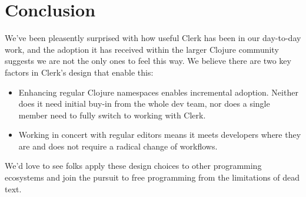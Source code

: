 \documentclass[sigconf,screen]{acmart}
\providecommand{\tightlist}{%
  \setlength{\itemsep}{0pt}\setlength{\parskip}{0pt}}
\begin{document}
\hypertarget{id}{%
\section{Conclusion}\label{id}}

We've been pleasently surprised with how useful Clerk has been in our day-to-day work, and the adoption it has received within the larger Clojure community suggests we are not the only ones to feel this way. We believe there are two key factors in Clerk's design that enable this:

\begin{itemize}
\tightlist
\item
  Enhancing regular Clojure namespaces enables incremental adoption. Neither does it need initial buy-in from the whole dev team, nor does a single member need to fully switch to working with Clerk.
\item
  Working in concert with regular editors means it meets developers where they are and does not require a radical change of workflows.
\end{itemize}

We'd love to see folks apply these design choices to other programming ecosystems and join the pursuit to free programming from the limitations of dead text.

%
%
%
%
\end{document}
